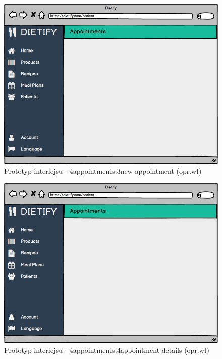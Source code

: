 \begin{minipage}{\textwidth}
    \begin{figure}[H]
        \centering\includegraphics[scale=0.55]{../mockup/4appointments_3new-appointment.png}
        \caption{Prototyp interfejsu - 4appointments:3new-appointment (opr.wł)}\label{rysunek:4appointments_3new-appointment}
    \end{figure}
\end{minipage}
\begin{minipage}{\textwidth}
    \begin{figure}[H]
        \centering\includegraphics[scale=0.55]{../mockup/4appointments_4appointment-details.png}
        \caption{Prototyp interfejsu - 4appointments:4appointment-details (opr.wł)}\label{rysunek:4appointments_4appointment-details}
    \end{figure}
\end{minipage}
